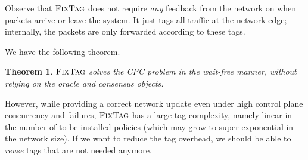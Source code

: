 \documentclass[11pt,pdftex,letter]{article}
\newcommand{\CPO}{\textsc{FixTag}}
\newcommand{\ie}{{\it i.e.}}
\newcommand{\pknote}[1]{\textcolor{heraldBlue}{\small \bf [PK: #1]}}
\newcommand{\pknote}[1]{}
\newcommand{\ignore}[1]{}
\newtheorem{theorem}{Theorem}
\newenvironment{proof}[1][Proof]{\noindent\textbf{#1.} }{\hfill $\Box$\\[2mm]}
\begin{document}
%
%
Observe that $\CPO$ does not require \emph{any} feedback from
the network on when packets arrive or leave the system. It just tags
all traffic at the network edge;
internally, the packets are only forwarded
according to these tags.

We have the following theorem.
\begin{theorem}\label{thm:tags}
$\CPO$ solves the CPC problem in the wait-free manner, without
  relying on the oracle and consensus objects.
\end{theorem}
%
%
However, while providing a correct network update even under high
control plane concurrency and failures, $\CPO$ has a large
tag complexity, namely linear in the number of to-be-installed
policies (which may grow to super-exponential in the network size).
If we want to reduce the tag overhead, we should be able to
\emph{reuse} tags that are not needed anymore.
\end{document}
